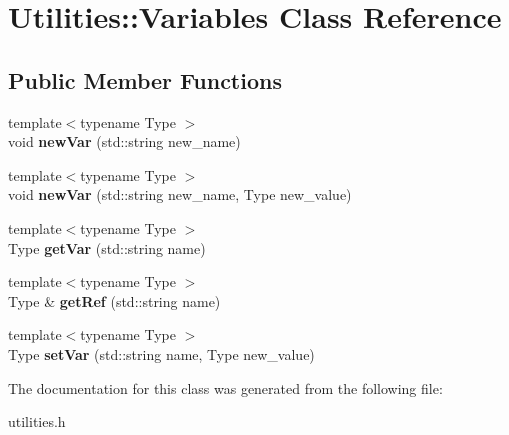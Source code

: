 \hypertarget{classUtilities_1_1Variables}{}\section{Utilities\+:\+:Variables Class Reference}
\label{classUtilities_1_1Variables}
\subsection*{Public Member Functions}
\begin{DoxyCompactItemize}
\item 
{\footnotesize template$<$typename Type $>$ }\\void {\bfseries new\+Var} (std\+::string new\+\_\+name)\hypertarget{classUtilities_1_1Variables_a7763fc000f45ef3956d61fdf2f783130}{}\label{classUtilities_1_1Variables_a7763fc000f45ef3956d61fdf2f783130}

\item 
{\footnotesize template$<$typename Type $>$ }\\void {\bfseries new\+Var} (std\+::string new\+\_\+name, Type new\+\_\+value)\hypertarget{classUtilities_1_1Variables_a67029a527f5810a298fc6538b6a634d2}{}\label{classUtilities_1_1Variables_a67029a527f5810a298fc6538b6a634d2}

\item 
{\footnotesize template$<$typename Type $>$ }\\Type {\bfseries get\+Var} (std\+::string name)\hypertarget{classUtilities_1_1Variables_adff493c2ea6249294a35204fd6b3f852}{}\label{classUtilities_1_1Variables_adff493c2ea6249294a35204fd6b3f852}

\item 
{\footnotesize template$<$typename Type $>$ }\\Type \& {\bfseries get\+Ref} (std\+::string name)\hypertarget{classUtilities_1_1Variables_a94ddcf8aa7cd6c60b8e611c006bc3e6d}{}\label{classUtilities_1_1Variables_a94ddcf8aa7cd6c60b8e611c006bc3e6d}

\item 
{\footnotesize template$<$typename Type $>$ }\\Type {\bfseries set\+Var} (std\+::string name, Type new\+\_\+value)\hypertarget{classUtilities_1_1Variables_ad5f59cff15b008435763a81bdac8bcf3}{}\label{classUtilities_1_1Variables_ad5f59cff15b008435763a81bdac8bcf3}

\end{DoxyCompactItemize}


The documentation for this class was generated from the following file\+:\begin{DoxyCompactItemize}
\item 
utilities.\+h\end{DoxyCompactItemize}
